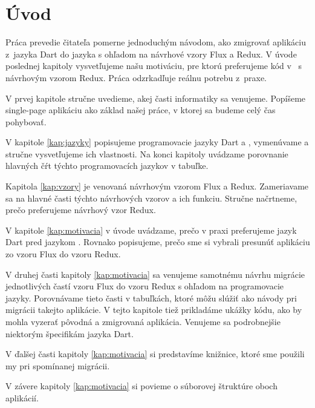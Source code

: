 \chapter*{Úvod} %

Práca prevedie čitateľa pomerne jednoduchým návodom, ako zmigrovať aplikáciu 
z~jazyka Dart do jazyka \JS{} s ohľadom na návrhové vzory Flux a Redux. 
V úvode poslednej kapitoly vysvetľujeme našu motiváciu, pre ktorú preferujeme kód 
v~\JS{} s návrhovým vzorom Redux. Práca odzrkadľuje reálnu potrebu z~praxe.

V prvej kapitole stručne uvedieme, akej časti informatiky sa venujeme. Popíšeme single-page aplikáciu ako základ našej práce, v ktorej sa budeme celý čas pohybovať.

V kapitole \ref{kap:jazyky} popisujeme programovacie jazyky Dart a \JS{}, vymenúvame a stručne vysvetľujeme ich vlastnosti. Na konci kapitoly uvádzame porovnanie hlavných čŕt týchto programovacích jazykov v tabuľke.

Kapitola \ref{kap:vzory} je venovaná návrhovým vzorom Flux a Redux. Zameriavame sa na hlavné časti týchto návrhových vzorov a ich funkciu. Stručne načrtneme, prečo preferujeme návrhový vzor Redux.

V kapitole \ref{kap:motivacia} v úvode uvádzame, prečo v praxi preferujeme jazyk Dart pred jazykom \JS{}. Rovnako popisujeme, prečo sme si vybrali presunúť aplikáciu zo vzoru Flux do vzoru Redux.

V druhej časti kapitoly \ref{kap:motivacia} sa venujeme samotnému návrhu migrácie jednotlivých častí vzoru Flux do vzoru Redux s ohľadom na programovacie jazyky. Porovnávame tieto časti v tabuľkách, ktoré môžu slúžiť ako návody pri migrácii takejto aplikácie. V tejto kapitole tiež prikladáme ukážky kódu, ako by mohla vyzerať pôvodná a zmigrovaná aplikácia. Venujeme sa podrobnejšie niektorým špecifikám jazyka Dart.

V ďalšej časti kapitoly \ref{kap:motivacia} si predstavíme knižnice, ktoré sme použili my pri spomínanej migrácii.

V závere kapitoly \ref{kap:motivacia} si povieme o súborovej štruktúre oboch aplikácií.
